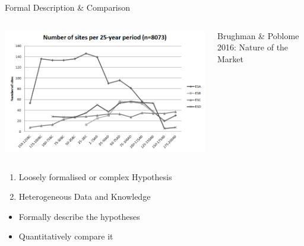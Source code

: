 \documentclass[12pt, notes=show,handout=no]{beamer}
\begin{document}
\begin{frame}{Formal Description \& Comparison}
    \begin{columns}
	\begin{column}{.6\textwidth}
	    \begin{center}
		\includegraphics[width=\textwidth]{images/wareRome.png} 
	    \end{center}
	\end{column}
	\begin{column}{.45\textwidth}
	\small Brughman \& Poblome 2016: Nature of the Market
	\end{column}
    \end{columns}
	\begin{enumerate}
	    \item<2-> Loosely formalised or complex Hypothesis
	    \item<3-> Heterogeneous Data and Knowledge
	\end{enumerate}

	\begin{itemize}
	    \item<5-> Formally describe the hypotheses
	    \item<6-> Quantitatively compare it
	\end{itemize}

\end{frame}
\end{document}
